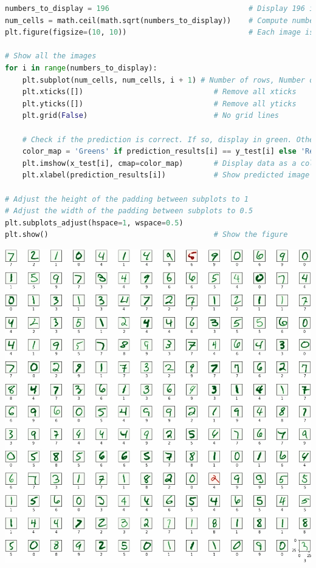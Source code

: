\documentclass{book}
\begin{document}
\begin{lstlisting}[language=Python, basicstyle=\ttfamily\small, keywordstyle=\color{blue}, commentstyle=\color{forestgreen}, stringstyle=\color{red}, showstringspaces=false]
numbers_to_display = 196                                # Display 196 images
num_cells = math.ceil(math.sqrt(numbers_to_display))    # Compute number of images per row
plt.figure(figsize=(10, 10))                            # Each image is in size 10x10 pixels

# Show all the images
for i in range(numbers_to_display):    
    plt.subplot(num_cells, num_cells, i + 1) # Number of rows, Number of columns, Index (start from 1)
    plt.xticks([])                              # Remove all xticks
    plt.yticks([])                              # Remove all yticks
    plt.grid(False)                             # No grid lines

    # Check if the prediction is correct. If so, display in green. Otherwise in red.
    color_map = 'Greens' if prediction_results[i] == y_test[i] else 'Reds'
    plt.imshow(x_test[i], cmap=color_map)       # Display data as a color image
    plt.xlabel(prediction_results[i])           # Show predicted image labels

# Adjust the height of the padding between subplots to 1
# Adjust the width of the padding between subplots to 0.5
plt.subplots_adjust(hspace=1, wspace=0.5)
plt.show()                                      # Show the figure
\end{lstlisting}
\begin{center}
    \includegraphics[scale=0.25]{chapter 7/ch7_figure19.jpeg}
\end{center}
\end{document}
